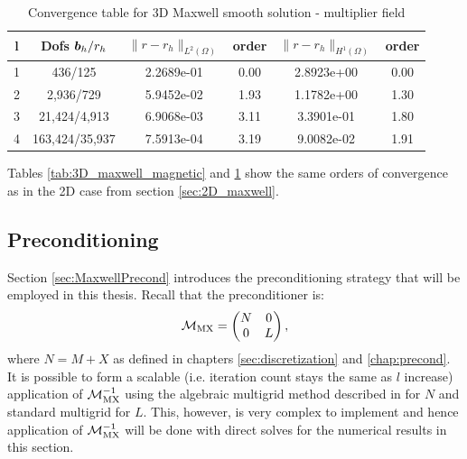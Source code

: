 \begin{table}[h!] \small
\begin{center}
    \begin{tabular}{cccccc}
    \hline
l &    Dofs $\boldsymbol b_h/r_h$ & $\|{r}-{r}_h\|_{L^2(\Omega)}$ & order & $\|{r}-{r}_h\|_{H^1(\Omega)}$ & order\\
    \hline
 1 &     436/125 &  2.2689e-01 &    0.00 &  2.8923e+00 &     0.00 \\
 2 &    2,936/729 &  5.9452e-02 &    1.93 &  1.1782e+00 &     1.30 \\
 3 &   21,424/4,913 &  6.9068e-03 &    3.11 &  3.3901e-01 &     1.80 \\
 4 &  163,424/35,937 &  7.5913e-04 &    3.19 &  9.0082e-02 &     1.91 \\

    \hline
    \end{tabular}
\caption{Convergence table for 3D Maxwell smooth solution - multiplier field}
\label{tab:3D_maxwell_multiplier}
\end{center}
\end{table}


Tables \ref{tab:3D_maxwell_magnetic} and \ref{tab:3D_maxwell_multiplier} show the same orders of convergence as in the 2D case from section \ref{sec:2D_maxwell}.




\subsection{Preconditioning}

Section \ref{sec:MaxwellPrecond} introduces the preconditioning strategy that will be employed in this thesis. Recall that the preconditioner is:
\begin{equation} \nonumber
\mathcal{M}_{\rm MX} =
\begin{pmatrix}
N& 0 \\
0 & L
\end{pmatrix},
\end{equation}
where $N = M+X$ as defined in chapters \ref{sec:discretization} and  \ref{chap:precond}.  It is possible to form a scalable (i.e. iteration count stays the same as $l$ increase) application of $\mathcal{M}_{\rm MX}^{-1}$  using the algebraic multigrid method described in \cite{hiptmair2007nodal} for $N$ and standard multigrid for $L$. This, however, is very complex to implement and hence application of $\mathcal{M}_{\rm MX}^{-1}$ will be done with direct solves for the numerical results in this section.

